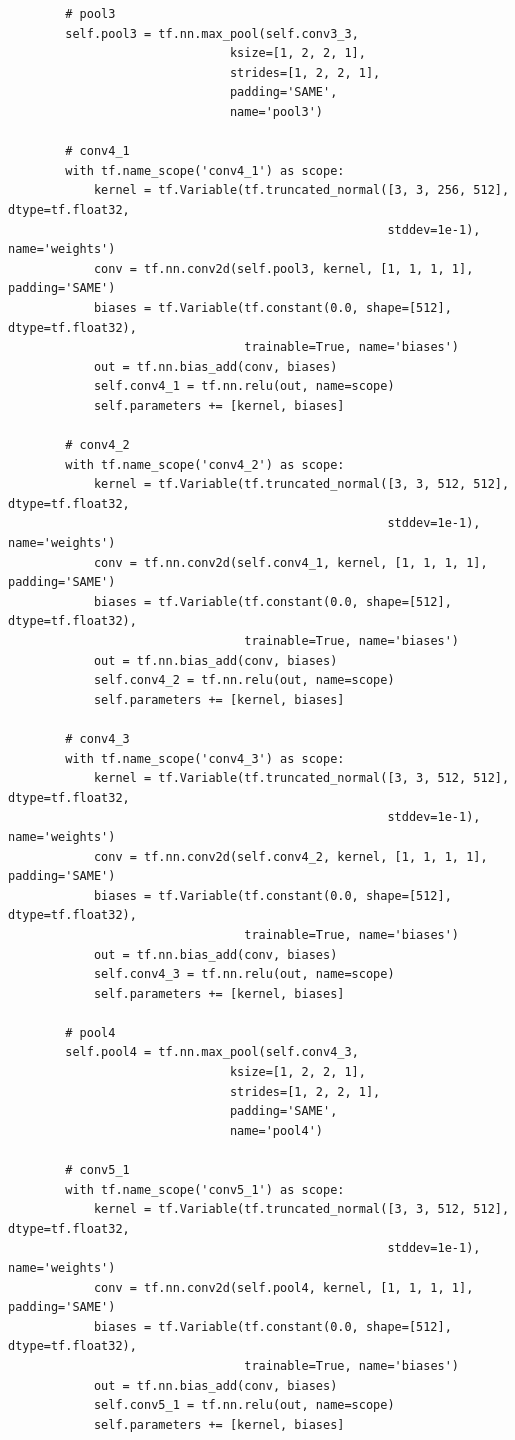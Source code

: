 \documentclass[11pt,a4paper]{article}
\begin{document}
\begin{verbatim}
        # pool3
        self.pool3 = tf.nn.max_pool(self.conv3_3,
                               ksize=[1, 2, 2, 1],
                               strides=[1, 2, 2, 1],
                               padding='SAME',
                               name='pool3')

        # conv4_1
        with tf.name_scope('conv4_1') as scope:
            kernel = tf.Variable(tf.truncated_normal([3, 3, 256, 512], dtype=tf.float32,
                                                     stddev=1e-1), name='weights')
            conv = tf.nn.conv2d(self.pool3, kernel, [1, 1, 1, 1], padding='SAME')
            biases = tf.Variable(tf.constant(0.0, shape=[512], dtype=tf.float32),
                                 trainable=True, name='biases')
            out = tf.nn.bias_add(conv, biases)
            self.conv4_1 = tf.nn.relu(out, name=scope)
            self.parameters += [kernel, biases]

        # conv4_2
        with tf.name_scope('conv4_2') as scope:
            kernel = tf.Variable(tf.truncated_normal([3, 3, 512, 512], dtype=tf.float32,
                                                     stddev=1e-1), name='weights')
            conv = tf.nn.conv2d(self.conv4_1, kernel, [1, 1, 1, 1], padding='SAME')
            biases = tf.Variable(tf.constant(0.0, shape=[512], dtype=tf.float32),
                                 trainable=True, name='biases')
            out = tf.nn.bias_add(conv, biases)
            self.conv4_2 = tf.nn.relu(out, name=scope)
            self.parameters += [kernel, biases]

        # conv4_3
        with tf.name_scope('conv4_3') as scope:
            kernel = tf.Variable(tf.truncated_normal([3, 3, 512, 512], dtype=tf.float32,
                                                     stddev=1e-1), name='weights')
            conv = tf.nn.conv2d(self.conv4_2, kernel, [1, 1, 1, 1], padding='SAME')
            biases = tf.Variable(tf.constant(0.0, shape=[512], dtype=tf.float32),
                                 trainable=True, name='biases')
            out = tf.nn.bias_add(conv, biases)
            self.conv4_3 = tf.nn.relu(out, name=scope)
            self.parameters += [kernel, biases]

        # pool4
        self.pool4 = tf.nn.max_pool(self.conv4_3,
                               ksize=[1, 2, 2, 1],
                               strides=[1, 2, 2, 1],
                               padding='SAME',
                               name='pool4')

        # conv5_1
        with tf.name_scope('conv5_1') as scope:
            kernel = tf.Variable(tf.truncated_normal([3, 3, 512, 512], dtype=tf.float32,
                                                     stddev=1e-1), name='weights')
            conv = tf.nn.conv2d(self.pool4, kernel, [1, 1, 1, 1], padding='SAME')
            biases = tf.Variable(tf.constant(0.0, shape=[512], dtype=tf.float32),
                                 trainable=True, name='biases')
            out = tf.nn.bias_add(conv, biases)
            self.conv5_1 = tf.nn.relu(out, name=scope)
            self.parameters += [kernel, biases]


\end{verbatim}
\end{document}
